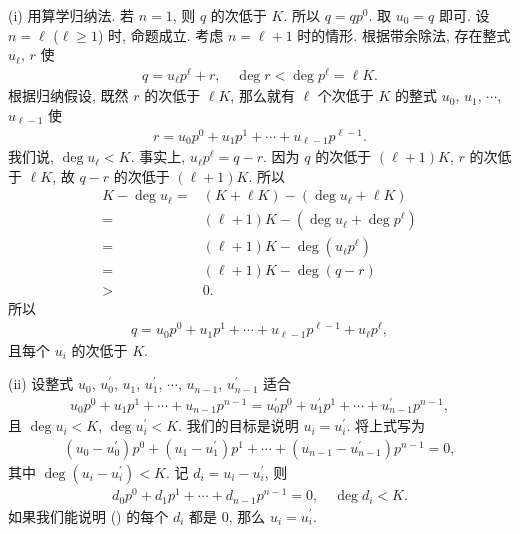 \begin{pf}
    (i) 用算学归纳法. 若 $n = 1$, 则 $q$ 的次低于 $K$. 所以 $q = q p^0$. 取 $u_0 = q$ 即可. 设 $n = \ell$ ($\ell \geq 1$) 时, 命题成立. 考虑 $n = \ell + 1$ 时的情形. 根据带余除法, 存在整式 $u_\ell$, $r$ 使
    \begin{align*}
        q = u_\ell p^\ell + r, \quad \deg r < \deg p^\ell = \ell K.
    \end{align*}
    根据归纳假设, 既然 $r$ 的次低于 $\ell K$, 那么就有 $\ell$ 个次低于 $K$ 的整式 $u_0$, $u_1$, $\cdots$, $u_{\ell - 1}$ 使
    \begin{align*}
        r = u_0 p^0 + u_1 p^1 + \cdots + u_{\ell - 1} p^{\ell - 1}.
    \end{align*}
    我们说, $\deg u_\ell < K$. 事实上, $u_\ell p^\ell = q - r$. 因为 $q$ 的次低于 $(\ell + 1)K$, $r$ 的次低于 $\ell K$, 故 $q - r$ 的次低于 $(\ell + 1)K$. 所以
    \begin{align*}
        K - \deg u_\ell
        = {} & (K + \ell K) - (\deg u_\ell + \ell K)     \\
        = {} & (\ell + 1)K - (\deg u_\ell + \deg p^\ell) \\
        = {} & (\ell + 1)K - \deg {(u_\ell p^\ell)}      \\
        = {} & (\ell + 1)K - \deg {(q - r)}              \\
        > {} & 0.
    \end{align*}
    所以
    \begin{align*}
        q = u_0 p^0 + u_1 p^1 + \cdots + u_{\ell - 1} p^{\ell - 1} + u_\ell p^\ell,
    \end{align*}
    且每个 $u_i$ 的次低于 $K$.

    (ii) 设整式 $u_0$, $u_0^{\prime}$, $u_1$, $u_1^{\prime}$, $\cdots$, $u_{n-1}$, $u_{n-1}^{\prime}$ 适合
    \begin{align*}
        u_0 p^0 + u_1 p^1 + \cdots + u_{n-1} p^{n-1} = u_0^{\prime} p^0 + u_1^{\prime} p^1 + \cdots + u_{n-1}^{\prime} p^{n-1},
    \end{align*}
    且 $\deg u_i < K$, $\deg u_i^{\prime} < K$. 我们的目标是说明 $u_i = u_i^{\prime}$. 将上式写为
    \begin{align*}
        (u_0 - u_0^{\prime}) p^0 + (u_1 - u_1^{\prime}) p^1 + \cdots + (u_{n-1} - u_{n-1}^{\prime}) p^{n-1} = 0,
    \end{align*}
    其中 $\deg {(u_i - u_i^{\prime})} < K$. 记 $d_i = u_i - u_i^{\prime}$, 则
    \begin{align*}
        d_0 p^0 + d_1 p^1 + \cdots + d_{n-1} p^{n-1} = 0, \quad \deg d_i < K. \tag*{(\myStar)}
    \end{align*}
    如果我们能说明 (\myStar) 的每个 $d_i$ 都是 $0$, 那么 $u_i = u_i^{\prime}$.


\end{pf}
